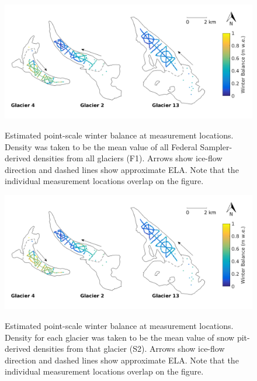\documentclass{sfuthesis}
\begin{document}
\begin{figure}[H]
	\centering
	\includegraphics[width = \textwidth]{SWEmap_opt3.png}\\
	\caption{Estimated point-scale winter balance at measurement locations. Density was taken to be the mean value of all Federal Sampler-derived densities from all glaciers (F1). Arrows show ice-flow direction and dashed lines show approximate ELA. Note that the individual measurement locations overlap on the figure.}
	\label{fig:SWEmap_F1}
\end{figure}

\begin{figure}[H]
	\centering
	\includegraphics[width =\textwidth]{SWEmap_opt4.png}\\
	\caption{Estimated point-scale winter balance at measurement locations. Density for each glacier was taken to be the mean value of snow pit-derived densities from that glacier (S2). Arrows show ice-flow direction and dashed lines show approximate ELA. Note that the individual measurement locations overlap on the figure.}
	\label{fig:SWEmap_S2}
\end{figure}
\end{document}
